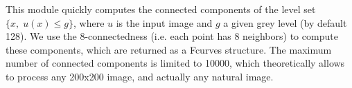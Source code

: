This module quickly computes the connected components of the 
level set $\{x, \; u(x) \leq g\}$, 
where $u$ is the input image and $g$ a given grey level 
(by default 128). 
We use the 8-connectedness (i.e. each point has 8 neighbors) to compute these
components, which are returned as a Fcurves structure.
The maximum number of connected 
components is limited to 10000, which theoretically allows to 
process any 200x200 image, and actually any natural image.